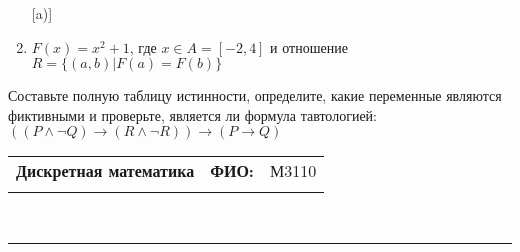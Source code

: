 \documentclass[10pt]{exam}
\newcommand{\class}{Дискретная математика}
\newcommand{\examdate}{}
\begin{document}
\begin{questions}
\begin{enumerate} [a)]
\item $F(x)=x^{2}+1$, где $x \in A = [-2, 4]$ и отношение $R = \{(a,b)|F(a) = F(b)\}$
\end{enumerate}\question Составьте полную таблицу истинности, определите, какие переменные являются фиктивными и проверьте, является ли формула тавтологией:
$(( P \land \neg Q) \rightarrow (R \land \neg R)) \rightarrow (P \rightarrow Q)$

\end{questions}
\newpage
\begin{flushright}
\begin{tabular}{p{2.8in} r l}
\textbf{\class} & \textbf{ФИО:} &М3110
\\

\textbf{\examdate} &&\\
\end{tabular}\\
\end{flushright}
\rule[1ex]{\textwidth}{.1pt}
\end{document}

